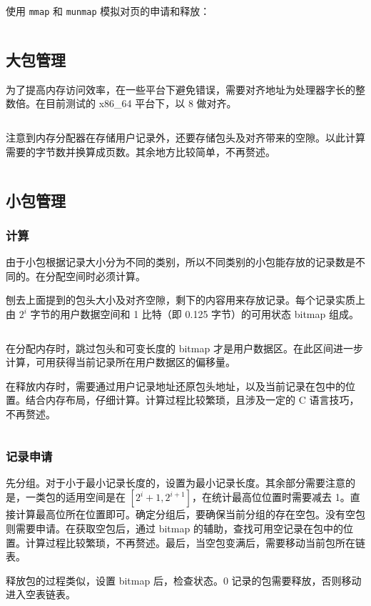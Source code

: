 \documentclass[12pt, a4paper]{article}
\newcommand{\LabSrc}[1]{\inputminted[fontsize=\scriptsize, breaklines]{c}{./src/#1.c}}
\begin{document}
\LabSrc{init}

使用 \texttt{mmap} 和 \texttt{munmap} 模拟对页的申请和释放：

\LabSrc{mem}

\subsection{大包管理}
为了提高内存访问效率，在一些平台下避免错误，需要对齐地址为处理器字长的整数倍。在目前测试的 x86\_64 平台下，以 8 做对齐。

\LabSrc{align}

注意到内存分配器在存储用户记录外，还要存储包头及对齐带来的空隙。以此计算需要的字节数并换算成页数。其余地方比较简单，不再赘述。

\LabSrc{blob}

\subsection{小包管理}
\subsubsection{计算}
由于小包根据记录大小分为不同的类别，所以不同类别的小包能存放的记录数是不同的。在分配空间时必须计算。

刨去上面提到的包头大小及对齐空隙，剩下的内容用来存放记录。每个记录实质上由 $2^i$ 字节的用户数据空间和 1 比特（即 0.125 字节）的可用状态 bitmap 组成。

\LabSrc{buck_calc}

在分配内存时，跳过包头和可变长度的 bitmap 才是用户数据区。在此区间进一步计算，可用获得当前记录所在用户数据区的偏移量。

在释放内存时，需要通过用户记录地址还原包头地址，以及当前记录在包中的位置。结合内存布局，仔细计算。计算过程比较繁琐，且涉及一定的 C 语言技巧，不再赘述。

\LabSrc{buck_addr}

\subsubsection{记录申请}
先分组。对于小于最小记录长度的，设置为最小记录长度。其余部分需要注意的是，一类包的适用空间是在 $[2^i+1, 2^{i+1}]$，在统计最高位位置时需要减去 1。直接计算最高位所在位置即可。确定分组后，要确保当前分组的存在空包。没有空包则需要申请。在获取空包后，通过 bitmap 的辅助，查找可用空记录在包中的位置。计算过程比较繁琐，不再赘述。最后，当空包变满后，需要移动当前包所在链表。

释放包的过程类似，设置 bitmap 后，检查状态。0 记录的包需要释放，否则移动进入空表链表。
\end{document}
